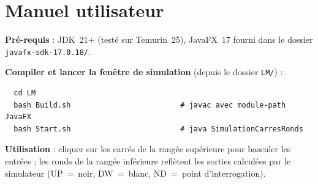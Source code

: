 \documentclass[11pt,a4paper]{article}
\begin{document}
\section*{Manuel utilisateur}

\textbf{Pr\'e-requis} : JDK~21+ (testé sur Temurin~25), JavaFX~17 fourni dans le dossier \texttt{javafx-sdk-17.0.18/}.

\textbf{Compiler et lancer la fen\^etre de simulation} (depuis le dossier \texttt{LM/}) :
\begin{verbatim}
  cd LM
  bash Build.sh                         # javac avec module-path JavaFX
  bash Start.sh                         # java SimulationCarresRonds
\end{verbatim}

\textbf{Utilisation} : cliquer sur les carr\'es de la rang\'ee sup\'erieure pour basculer les entr\'ees ; les ronds de la rang\'ee inf\'erieure refl\`etent les sorties calcul\'ees par le simulateur (UP~=~noir, DW~=~blanc, ND~=~point d'interrogation).
\end{document}
